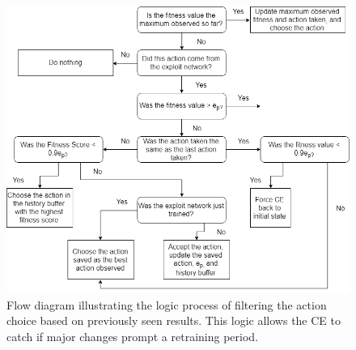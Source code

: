 \begin{figure}[ht]
\includegraphics[width=\textwidth]{figures/action_acceptance_protocol.png}
\caption{Flow diagram illustrating the logic process of filtering the action choice based on previously seen results. This logic allows the CE to catch if major changes prompt a retraining period.}
\end{figure}

